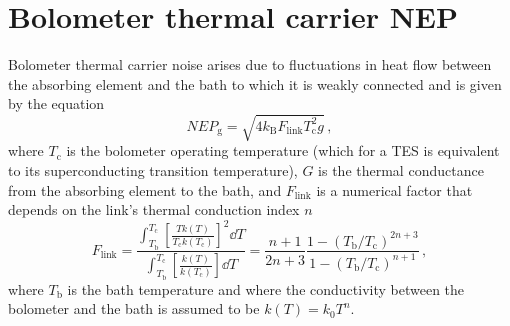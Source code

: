 \section{Bolometer thermal carrier NEP}
\label{sec:bolometer_thermal_carrier_noise}

Bolometer thermal carrier noise arises due to fluctuations in heat flow between the absorbing element and the bath to which it is weakly connected and is given by the equation
\begin{equation}
    NEP_{\mathrm{g}} = \sqrt{4 k_{\mathrm{B}} F_{\mathrm{link}} T_{\mathrm{c}}^{2} g}\, ,
    \label{eq:nep_g}
\end{equation}
where $T_{\mathrm{c}}$ is the bolometer operating temperature (which for a TES is equivalent to its superconducting transition temperature), $G$ is the thermal conductance from the absorbing element to the bath, and $F_{\mathrm{link}}$ is a numerical factor that depends on the link's thermal conduction index $n$
\begin{equation}
    F_{\mathrm{link}} = \frac{\int_{T_{\mathrm{b}}}^{T_{\mathrm{c}}} \left[ \frac{T k(T)}{T_{\mathrm{c}} k(T_{\mathrm{c}})} \right]^{2} \dd T}{\int_{T_{\mathrm{b}}}^{T_{\mathrm{c}}} \left[ \frac{k(T)}{k(T_{\mathrm{c}})} \right] \dd T} = \frac{n + 1}{2 n + 3} \frac{1 - \left( T_{\mathrm{b}} / T_{\mathrm{c}} \right)^{2n + 3}}{1 - \left( T_{\mathrm{b}} / T_{\mathrm{c}} \right)^{n + 1}} \, ,
    \label{eq:flink}
\end{equation}
where $T_{\mathrm{b}}$ is the bath temperature and where the conductivity between the bolometer and the bath is assumed to be $k(T) = k_{0} T^{n}$.

